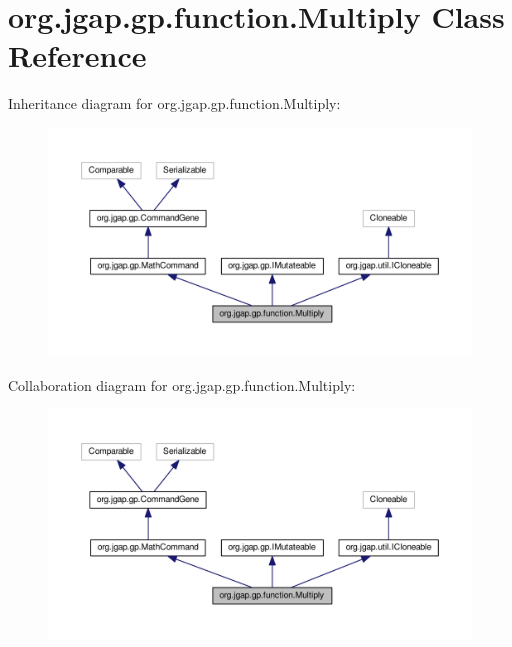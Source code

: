 \hypertarget{classorg_1_1jgap_1_1gp_1_1function_1_1_multiply}{\section{org.\-jgap.\-gp.\-function.\-Multiply Class Reference}
\label{classorg_1_1jgap_1_1gp_1_1function_1_1_multiply}
}


Inheritance diagram for org.\-jgap.\-gp.\-function.\-Multiply\-:
\nopagebreak
\begin{figure}[H]
\begin{center}
\leavevmode
\includegraphics[width=350pt]{classorg_1_1jgap_1_1gp_1_1function_1_1_multiply__inherit__graph}
\end{center}
\end{figure}


Collaboration diagram for org.\-jgap.\-gp.\-function.\-Multiply\-:
\nopagebreak
\begin{figure}[H]
\begin{center}
\leavevmode
\includegraphics[width=350pt]{classorg_1_1jgap_1_1gp_1_1function_1_1_multiply__coll__graph}
\end{center}
\end{figure}
